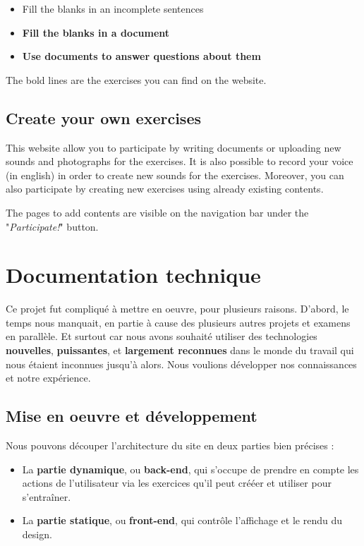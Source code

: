 \documentclass[12pt,a4paper]{report}
\begin{document}
\begin{itemize}
\item Fill the blanks in an incomplete sentences
\item \textbf{Fill the blanks in a document}
\item \textbf{Use documents to answer questions about them}
\end{itemize}

The bold lines are the exercises you can find on the website.

\subsection{Create your own exercises}

This website allow you to participate by writing documents or uploading new
sounds and photographs for the exercises. It is also possible to record your
voice (in english) in order to create new sounds for the exercises. Moreover,
you can also participate by creating new exercises using already existing
contents.

The pages to add contents are visible on the navigation bar
under the "\textit{Participate!}" button.

\pagebreak

\section{Documentation technique}

Ce projet fut compliqué à mettre en oeuvre, pour plusieurs raisons. D'abord, le temps nous manquait, en partie à cause des plusieurs autres projets et examens en parallèle. Et surtout car nous avons souhaité utiliser des technologies \textbf{nouvelles}, \textbf{puissantes}, et \textbf{largement reconnues} dans le monde du travail qui nous étaient inconnues jusqu'à alors. Nous voulions développer nos connaissances et notre expérience.


\subsection{Mise en oeuvre et développement}

Nous pouvons découper l'architecture du site en deux parties bien précises :
\begin{itemize}
	\item La \textbf{partie dynamique}, ou \textbf{back-end}, qui s'occupe de prendre en compte les actions
	 de l'utilisateur via les exercices qu'il peut crééer et utiliser pour
	 s'entra\^iner.
	 
	 \item La \textbf{partie statique}, ou \textbf{front-end}, qui contrôle l'affichage et le rendu du design.
\end{itemize}
\end{document}
